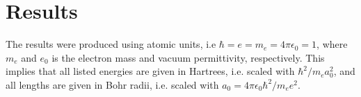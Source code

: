 \chapter{Results}

The results were produced using atomic units, i.e $\hbar=e=m_e=4\pi\epsilon_0 = 1$, where $m_e$ and $e_0$ is the electron mass and vacuum permittivity, respectively. This implies that all listed energies are given in Hartrees, i.e. scaled with $\hbar^2/m_ea_0^2$, and all lengths are given in Bohr radii, i.e. scaled with $a_0=4\pi\epsilon_0\hbar^2/m_e e^2$.








 
 

 
 
 



